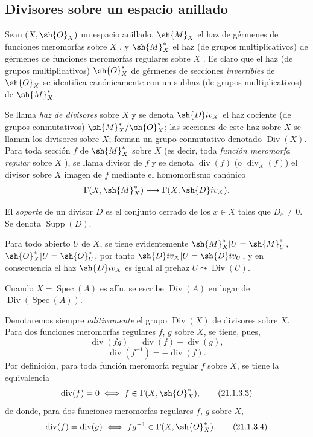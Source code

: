 \subsection{Divisores sobre un espacio anillado}
\label{subsection:IV.21.1}
\label{IV.21.1}

\begin{env}[21.1.1]
\label{IV.21.1.1}
Sean $(X,\sh{O}_X)$ un espacio anillado, $\sh{M}_X$ el haz de gérmenes de funciones meromorfas sobre $X$ , y $\sh{M}_X^*$ el haz (de grupos multiplicativos) de gérmenes de funciones meromorfas regulares sobre $X$ .
Es claro que el haz (de grupos multiplicativos) $\sh{O}_X^*$ de gérmenes de secciones \emph{invertibles} de $\sh{O}_X$ se identifica canónicamente con un subhaz (de grupos multiplicativos) de $\sh{M}_X^*$.
\end{env}

\begin{definition}[21.1.2]
\label{IV.21.1.2}
Se llama \emph{haz de divisores} sobre $X$ y se denota $\sh{D}iv_X$ el haz cociente (de grupos conmutativos) $\sh{M}_X^*/\sh{O}_X^*$;
las secciones de este haz sobre $X$ se llaman los divisores sobre $X$; forman un grupo conmutativo denotado $\operatorname{Div}(X)$.
Para toda sección $f$ de $\sh{M}_X^*$ sobre $X$ \textup{(es decir, toda \emph{función meromorfa regular} sobre $X$ )}, se llama divisor de $f$ y se denota $\operatorname{div}(f)$ \textup{(o $\operatorname{div}_X(f)$)} el divisor sobre $X$ imagen de $f$ mediante el homomorfismo canónico
\[
  \Gamma(X,\sh{M}_X^*)\longrightarrow\Gamma(X,\sh{D}iv_X).
\]
\end{definition}


El \emph{soporte} de un divisor $D$ es el conjunto cerrado de los $x\in X$ tales que $D_x\neq0$.
Se denota $\operatorname{Supp}(D)$.

Para todo abierto $U$ de $X$, se tiene evidentemente $\sh{M}_X^*|U=\sh{M}_U^*$, $\sh{O}_X^*|U=\sh{O}_U^*$, por tanto $\sh{D}iv_X|U=\sh{D}iv_U$, y en consecuencia el haz $\sh{D}iv_X$ es igual al prehaz $U\leadsto\operatorname{Div}(U)$.

Cuando $X=\operatorname{Spec}(A)$ es afín, se escribe $\operatorname{Div}(A)$ en lugar de $\operatorname{Div}(\operatorname{Spec}(A))$.

\begin{env}[21.1.3]
\label{IV.21.1.3}
Denotaremos siempre \emph{aditivamente} el grupo $\operatorname{Div}(X)$ de divisores sobre $X$.
Para dos funciones meromorfas regulares $f$, $g$ sobre $X$, se tiene, pues,
\[
\label{IV.21.1.3.1}
  \operatorname{div}(fg)=\operatorname{div}(f)+\operatorname{div}(g),
  \tag{21.1.3.1}
\]
\[
\label{IV.21.1.3.2}
  \operatorname{div}(f^{-1})=-\operatorname{div}(f).
  \tag{21.1.3.2}
\]
Por definición, para toda función meromorfa regular $f$ sobre $X$, se tiene la equivalencia
\[
\label{IV.21.1.3.3}
  \operatorname{div}(f)=0 \iff f\in\Gamma(X,\sh{O}_X^*),
  \tag{21.1.3.3}
\]
de donde, para dos funciones meromorfas regulares $f$, $g$ sobre $X$,
\[
\label{IV.21.1.3.4}
  \operatorname{div}(f)=\operatorname{div}(g) \iff fg^{-1}\in\Gamma(X,\sh{O}_X^*).
  \tag{21.1.3.4}
\]
\end{env}

